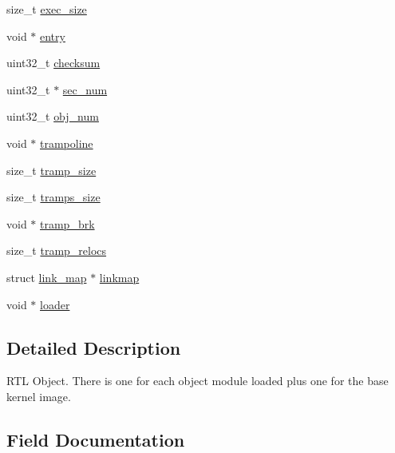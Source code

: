 \begin{DoxyCompactItemize}
\item 
size\+\_\+t \mbox{\hyperlink{structrtems__rtl__obj_ac7576e17b37ec5daf15098d5db5a5292}{exec\+\_\+size}}
\item 
void $\ast$ \mbox{\hyperlink{structrtems__rtl__obj_a627c539d0bcb65c4f21dbc60e6b8f29b}{entry}}
\item 
uint32\+\_\+t \mbox{\hyperlink{structrtems__rtl__obj_af15b3ca1e198f3727d90debe8d45df50}{checksum}}
\item 
uint32\+\_\+t $\ast$ \mbox{\hyperlink{structrtems__rtl__obj_a66b7fb99450fc67fb2aad187be27cc60}{sec\+\_\+num}}
\item 
uint32\+\_\+t \mbox{\hyperlink{structrtems__rtl__obj_aa3d9d9e4eaa9bda865d499575e261cdb}{obj\+\_\+num}}
\item 
void $\ast$ \mbox{\hyperlink{structrtems__rtl__obj_a50b0ecdf04468c2685b2f578b1632ec2}{trampoline}}
\item 
size\+\_\+t \mbox{\hyperlink{structrtems__rtl__obj_a8d66b3de8432ae75acc9a7c377519a9b}{tramp\+\_\+size}}
\item 
size\+\_\+t \mbox{\hyperlink{structrtems__rtl__obj_a2ede787b31e48048590c979a8cf3b034}{tramps\+\_\+size}}
\item 
void $\ast$ \mbox{\hyperlink{structrtems__rtl__obj_a848481b6873e3d840c55cd4a83108606}{tramp\+\_\+brk}}
\item 
size\+\_\+t \mbox{\hyperlink{structrtems__rtl__obj_a253873bd4a2b00180aa5830ce9bed43c}{tramp\+\_\+relocs}}
\item 
struct \mbox{\hyperlink{structlink__map}{link\+\_\+map}} $\ast$ \mbox{\hyperlink{structrtems__rtl__obj_aa5a2d97b0bd9a43103a40877fad51bfa}{linkmap}}
\item 
void $\ast$ \mbox{\hyperlink{structrtems__rtl__obj_a744f505844745c100beb7a4b203d29b5}{loader}}
\end{DoxyCompactItemize}


\subsection{Detailed Description}
R\+TL Object. There is one for each object module loaded plus one for the base kernel image. 

\subsection{Field Documentation}
\mbox{\label{structrtems__rtl__obj_af5800ef21318935014e24523aab3f383}} 
